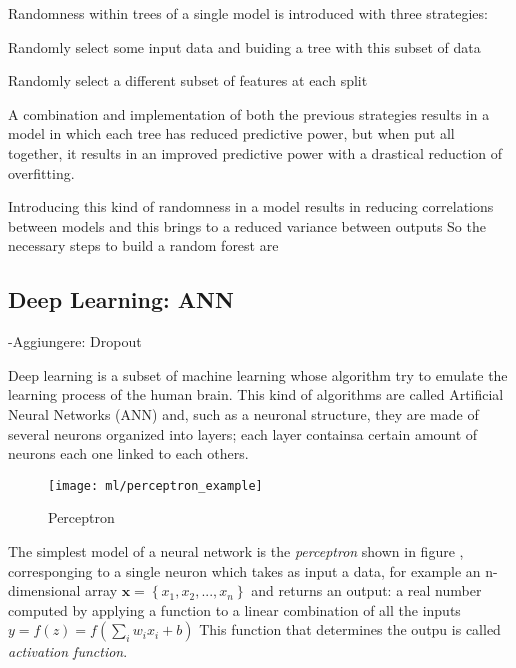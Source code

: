 \documentclass[a4paper,11pt]{article}
\begin{document}


Randomness within trees of a single model is introduced with three strategies:
\begin{enumerate*}
\item Randomly select some input data and buiding a tree with this subset of data
\item Randomly select a different subset of features at each split
\item A combination and implementation of both the previous strategies results in a model in which each tree has reduced predictive power, but when put all together, it results in an improved predictive power with a drastical reduction of overfitting.
\end{enumerate*}

Introducing this kind of randomness in a model results in reducing correlations between models and this brings to a reduced variance between outputs
So the necessary steps to build a random forest are



\subsection{Deep Learning: ANN}
-Aggiungere: Dropout

Deep learning is a subset of machine learning whose algorithm try to emulate the learning process of the human brain.
This kind of algorithms are called Artificial Neural Networks (ANN) and, such as a neuronal structure, they are made of several neurons organized into layers; each layer containsa certain amount of neurons each one linked to each others.

\begin{wrapfigure}{r}{0.4\textwidth}
\centering
\texttt{[image: ml/perceptron\_example]}
\caption{Perceptron}
\label{fig:perceptron}
\end{wrapfigure}

The simplest model of a neural network is the \emph{perceptron} shown in figure , corresponging to a single neuron which takes as input a data, for example an n-dimensional array $\textbf{x} = \left\{ x_1, x_2, ..., x_n\right\}$ and returns an output: a real number computed by applying a function to a linear combination of all the inputs $ y = f(z) = f \left ( \sum_i w_{i} x_i + b \right )$
This function that determines the outpu is called \emph{activation function}.
\end{document}
